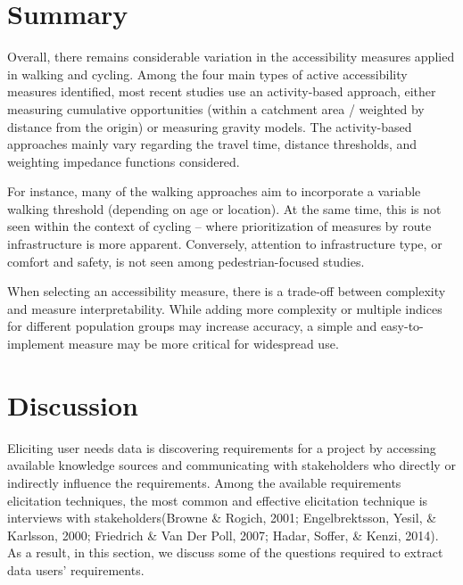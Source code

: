 \documentclass[
11pt, %
oneside, %
english, %
singlespacing, %
]{macthesis} %
\begin{document}
\hypertarget{summary}{%
\section{Summary}\label{summary}}

Overall, there remains considerable variation in the accessibility measures applied in walking and cycling. Among the four main types of active accessibility measures identified, most recent studies use an activity-based approach, either measuring cumulative opportunities (within a catchment area / weighted by distance from the origin) or measuring gravity models. The activity-based approaches mainly vary regarding the travel time, distance thresholds, and weighting impedance functions considered.

For instance, many of the walking approaches aim to incorporate a variable walking threshold (depending on age or location). At the same time, this is not seen within the context of cycling -- where prioritization of measures by route infrastructure is more apparent. Conversely, attention to infrastructure type, or comfort and safety, is not seen among pedestrian-focused studies.

When selecting an accessibility measure, there is a trade-off between complexity and measure interpretability. While adding more complexity or multiple indices for different population groups may increase accuracy, a simple and easy-to-implement measure may be more critical for widespread use.

\hypertarget{discussion}{%
\section{Discussion}\label{discussion}}

Eliciting user needs data is discovering requirements for a project by accessing available knowledge sources and communicating with stakeholders who directly or indirectly influence the requirements. Among the available requirements elicitation techniques, the most common and effective elicitation technique is interviews with stakeholders(Browne \& Rogich, 2001; Engelbrektsson, Yesil, \& Karlsson, 2000; Friedrich \& Van Der Poll, 2007; Hadar, Soffer, \& Kenzi, 2014). As a result, in this section, we discuss some of the questions required to extract data users' requirements.
\end{document}
